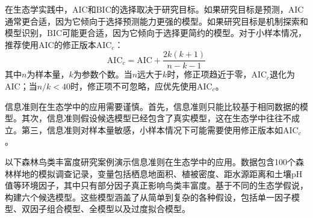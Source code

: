 \documentclass[
  twoside,12pt,fontset=none]{ctexbook}
\begin{document}
在生态学实践中，\(\text{AIC}\)和\(\text{BIC}\)的选择取决于研究目标。如果研究目标是预测，\(\text{AIC}\)通常更合适，因为它倾向于选择预测能力更强的模型。如果研究目标是机制探索和模型识别，\(\text{BIC}\)可能更合适，因为它倾向于选择更简约的模型。对于小样本情况，推荐使用\(\text{AIC}\)的修正版本\(\text{AIC}_c\)：
\[\text{AIC}_c = \text{AIC} + \frac{2k(k+1)}{n-k-1}\]
其中\(n\)为样本量，\(k\)为参数个数。当\(n\)远大于\(k\)时，修正项趋近于零，\(\text{AIC}_c\)退化为\(\text{AIC}\)；当\(n/k < 40\)时，修正项不可忽略，应优先使用\(\text{AIC}_c\)。

信息准则在生态学中的应用需要谨慎。首先，信息准则只能比较基于相同数据的模型。其次，信息准则假设候选模型已经包含了真实模型，这在生态学中往往不成立。第三，信息准则对样本量敏感，小样本情况下可能需要使用修正版本如\(\text{AIC}_c\)。

以下森林鸟类丰富度研究案例演示信息准则在生态学中的应用。数据包含100个森林样地的模拟调查记录，变量包括栖息地面积、植被密度、距水源距离和土壤pH值等环境因子，其中只有部分因子真正影响鸟类丰富度。基于不同的生态学假说，构建六个候选模型。这些模型涵盖了从简单到复杂的各种假设，包括单一因子模型、双因子组合模型、全模型以及过度拟合模型。
\end{document}
